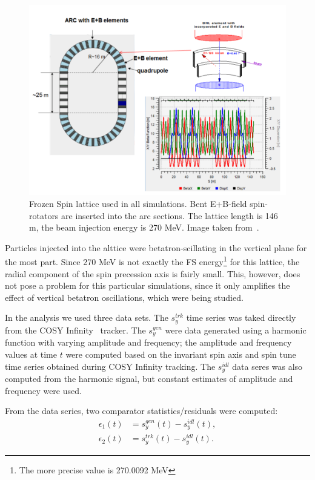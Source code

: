 \documentclass[]{elsarticle}
\begin{document}
\begin{figure}[h]
  \includegraphics[width=\linewidth]{img/BNL_lattice}
  \caption{Frozen Spin lattice used in all simulations. Bent E+B-field spin-rotators are inserted
    into the arc sections. The lattice length is 146 m,
    the beam injection energy is 270 MeV. Image taken from~\cite{Senichev:Lattices}.\label{fig:BNL_lattice}}
\end{figure}


Particles injected into the alttice were betatron-scillating in the vertical plane for the most part.
Since 270 MeV is not exactly the FS energy\footnote{The more precise value is 270.0092 MeV}
for this lattice, the radial component of the spin precession axis is fairly small. This, however,
does not pose a problem for this particular simulations, since it only amplifies the effect of vertical
betatron oscillations, which were being studied.

In the analysis we used three data sets. The $s_y^{trk}$ time series was taked directly
from the COSY Infinity~\cite{COSYInf} tracker. The $s_y^{gen}$ were data generated using a harmonic function
with varying amplitude and frequency; the amplitude and frequency values at time $t$ were computed based
on the invariant spin axis and spin tune time series obtained during COSY Infinity tracking.
The $s_y^{idl}$ data seres was also computed from the harmonic signal, but constant estimates of
amplitude and frequency were used.

From the data series, two comparator statistics/residuals were computed:
\begin{align*}
  \epsilon_1(t) &= s_y^{gen}(t) - s_y^{idl}(t), \tag{generator residual}\\
  \epsilon_2(t) &= s_y^{trk}(t) - s_y^{idl}(t). \tag{tracker residual}
\end{align*}
\end{document}
